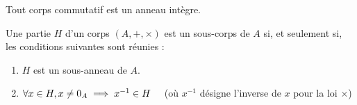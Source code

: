 \begin{prop}
    Tout corps commutatif est un anneau intègre.
\end{prop}

\begin{defprop}
    Une partie \(H\) d’un corps \((A, +, \times)\) est un sous-corps de \(A\) si, et seulement si, les conditions suivantes sont réunies :
    \begin{enumerate}
        \item  \(H \) est un sous-anneau de \(A\).
        \item  \(\forall x \in H, x\neq 0_A \implies x^{-1 } \in H \quad\) (où \(x^{-1}\) désigne l’inverse de \(x\) pour la loi \(\times\))
    \end{enumerate}
\end{defprop}